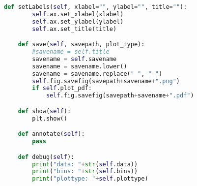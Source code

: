\begin{lstlisting}[language=Python,caption=myplot.py]
    def setLabels(self, xlabel="", ylabel="", title=""):
        self.ax.set_xlabel(xlabel)
        self.ax.set_ylabel(ylabel)
        self.ax.set_title(title)

    def save(self, savepath, plot_type):
        #savename = self.title
        savename = self.savename
        savename = savename.lower()
        savename = savename.replace(" ", "_")
        self.fig.savefig(savepath+savename+".png")
        if self.plot_pdf:
            self.fig.savefig(savepath+savename+".pdf")

    def show(self):
        plt.show()

    def annotate(self):
        pass

    def debug(self):
        print("data: "+str(self.data))
        print("bins: "+str(self.bins))
        print("plottype: "+self.plottype)

\end{lstlisting}
